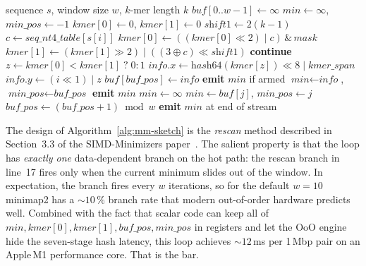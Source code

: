 \begin{algorithm}[H]
\caption{\texttt{mm\_sketch} (simplified; minimap2 \texttt{sketch.c})}
\label{alg:mm-sketch}
\small
\begin{algorithmic}[1]
\Require sequence $s$, window size $w$, $k$-mer length $k$
\State $\textit{buf}[0..w-1] \gets \infty$ 
\State $\textit{min} \gets \infty$, $\textit{min\_pos} \gets -1$
\State $\textit{kmer}[0] \gets 0$, $\textit{kmer}[1] \gets 0$ 
\State $\textit{shift1} \gets 2(k-1)$
    \State $c \gets \textit{seq\_nt4\_table}[s[i]]$ 
    \State $\textit{kmer}[0] \gets ((\textit{kmer}[0] \ll 2)\;|\;c)\,\&\,\textit{mask}$ 
    \State $\textit{kmer}[1] \gets (\textit{kmer}[1] \gg 2)\;|\;((3 \oplus c) \ll \textit{shift1})$ 
     
        \State \textbf{continue} 
    \EndIf
    \State $z \gets \textit{kmer}[0] < \textit{kmer}[1] \;?\; 0 : 1$ 
    \State $\textit{info}.x \gets \textit{hash64}(\textit{kmer}[z]) \ll 8 \;|\; \textit{kmer\_span}$
    \State $\textit{info}.y \gets (i \ll 1)\;|\;z$
    \State $\textit{buf}[\textit{buf\_pos}] \gets \textit{info}$
                                      
      \State \textbf{emit} $\textit{min}$ if armed
      \State $\textit{min} \gets \textit{info}$, $\textit{min\_pos} \gets \textit{buf\_pos}$
                              
      \State \textbf{emit} $\textit{min}$
      \State $\textit{min} \gets \infty$
              
          \State $\textit{min} \gets \textit{buf}[j]$, $\textit{min\_pos} \gets j$
        \EndIf
      \EndFor
    \EndIf
    \State $\textit{buf\_pos} \gets (\textit{buf\_pos} + 1) \bmod w$
\EndFor
\State \textbf{emit} $\textit{min}$ at end of stream
\end{algorithmic}
\end{algorithm}

The design of Algorithm~\ref{alg:mm-sketch} is the
\emph{rescan} method described in Section~3.3 of the SIMD-Minimizers
paper~\cite{groot_koerkamp_simd_minimizers_2025}.
The salient property is that the loop has \emph{exactly one}
data-dependent branch on the hot path: the rescan branch in line~17
fires only when the current minimum slides out of the window.  In
expectation, the branch fires every $w$ iterations, so for the
default $w=10$ minimap2 has a $\sim 10\,\%$ branch rate that
modern out-of-order hardware predicts well.  Combined with the fact
that scalar code can keep all of $\textit{min}, \textit{kmer}[0],
\textit{kmer}[1], \textit{buf\_pos}, \textit{min\_pos}$ in
registers and let the OoO engine hide the seven-stage hash latency,
this loop achieves $\sim 12$\,ms per 1\,Mbp pair on an Apple\,M1
performance core.  That is the bar.

